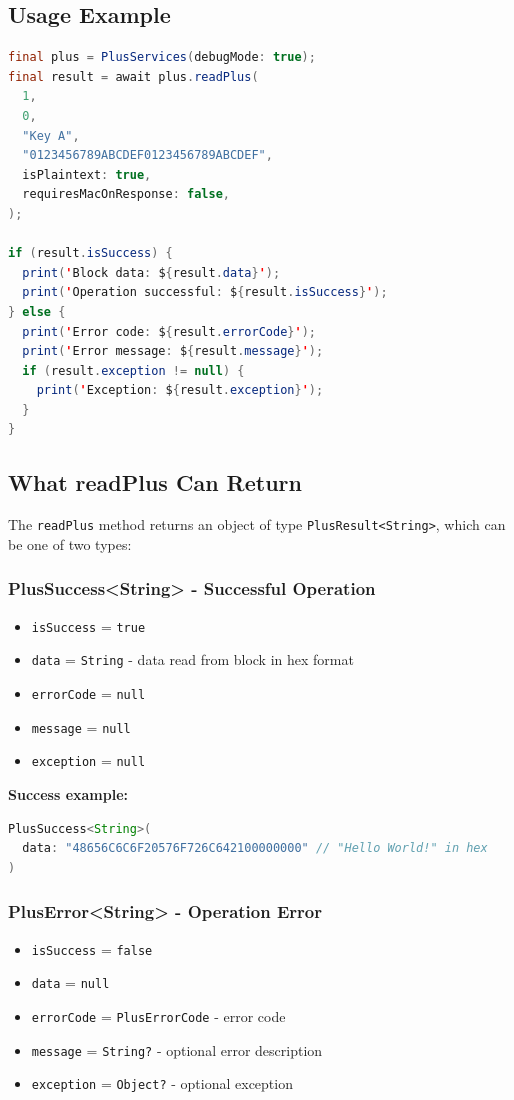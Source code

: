\documentclass[a4paper,12pt]{article}
\begin{document}
\newpage

\subsection{Usage Example}
\begin{lstlisting}[language=Java]
final plus = PlusServices(debugMode: true);
final result = await plus.readPlus(
  1,
  0,
  "Key A",
  "0123456789ABCDEF0123456789ABCDEF",
  isPlaintext: true,
  requiresMacOnResponse: false,
);

if (result.isSuccess) {
  print('Block data: ${result.data}');
  print('Operation successful: ${result.isSuccess}');
} else {
  print('Error code: ${result.errorCode}');
  print('Error message: ${result.message}');
  if (result.exception != null) {
    print('Exception: ${result.exception}');
  }
}
\end{lstlisting}

\subsection{What readPlus Can Return}

The \texttt{readPlus} method returns an object of type \texttt{PlusResult<String>}, which can be one of two types:

\subsubsection*{PlusSuccess<String> - Successful Operation}
\begin{itemize}
    \item \texttt{isSuccess} = \texttt{true}
    \item \texttt{data} = \texttt{String} - data read from block in hex format
    \item \texttt{errorCode} = \texttt{null}
    \item \texttt{message} = \texttt{null}
    \item \texttt{exception} = \texttt{null}
\end{itemize}

\textbf{Success example:}
\begin{lstlisting}[language=Java]
PlusSuccess<String>(
  data: "48656C6C6F20576F726C642100000000" // "Hello World!" in hex
)
\end{lstlisting}

\newpage

\subsubsection*{PlusError<String> - Operation Error}
\begin{itemize}
    \item \texttt{isSuccess} = \texttt{false}
    \item \texttt{data} = \texttt{null}
    \item \texttt{errorCode} = \texttt{PlusErrorCode} - error code
    \item \texttt{message} = \texttt{String?} - optional error description
    \item \texttt{exception} = \texttt{Object?} - optional exception
\end{itemize}
\end{document}
